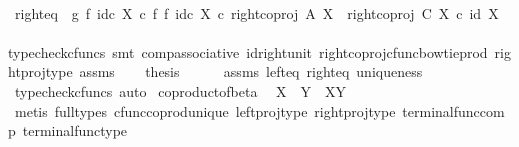 \begin{isabellebody}
\ \ \isamarkupfalse%
\ right{\isacharunderscore}{\kern0pt}eq{\isacharcolon}{\kern0pt}\ {\isachardoublequoteopen}\ {\isacharparenleft}{\kern0pt}{\isacharparenleft}{\kern0pt}g\ {\isasymbowtie}\isactrlsub f\ id\isactrlsub c\ X{\isacharparenright}{\kern0pt}\ {\isasymcirc}\isactrlsub c\ {\isacharparenleft}{\kern0pt}f\ {\isasymbowtie}\isactrlsub f\ id\isactrlsub c\ X{\isacharparenright}{\kern0pt}{\isacharparenright}{\kern0pt}\ {\isasymcirc}\isactrlsub c\ right{\isacharunderscore}{\kern0pt}coproj\ A\ X\ {\isacharequal}{\kern0pt}\ right{\isacharunderscore}{\kern0pt}coproj\ C\ X\ {\isasymcirc}\isactrlsub c\ id\ X{\isachardoublequoteclose}\isanewline
\ \ \ \ \isamarkupfalse%
{\isacharparenleft}{\kern0pt}typecheck{\isacharunderscore}{\kern0pt}cfuncs{\isacharcomma}{\kern0pt}\ smt\ comp{\isacharunderscore}{\kern0pt}associative{}\ id{\isacharunderscore}{\kern0pt}right{\isacharunderscore}{\kern0pt}unit{}\ right{\isacharunderscore}{\kern0pt}coproj{\isacharunderscore}{\kern0pt}cfunc{\isacharunderscore}{\kern0pt}bowtie{\isacharunderscore}{\kern0pt}prod\ right{\isacharunderscore}{\kern0pt}proj{\isacharunderscore}{\kern0pt}type\ assms{\isacharparenright}{\kern0pt}\isanewline
\isanewline
\ \ \isamarkupfalse%
\ {\isacharquery}{\kern0pt}thesis\isanewline
\ \ \ \ \isamarkupfalse%
\ assms\ left{\isacharunderscore}{\kern0pt}eq\ right{\isacharunderscore}{\kern0pt}eq\ uniqueness\ \isamarkupfalse%
\ {\isacharparenleft}{\kern0pt}typecheck{\isacharunderscore}{\kern0pt}cfuncs{\isacharcomma}{\kern0pt}\ auto{\isacharparenright}{\kern0pt}\isanewline
{}\isamarkupfalse%
%
\endisatagproof
{\isafoldproof}%
%
\isadelimproof
\isanewline
%
\endisadelimproof
\isanewline
{}\isamarkupfalse%
\ coproduct{\isacharunderscore}{\kern0pt}of{\isacharunderscore}{\kern0pt}beta{\isacharcolon}{\kern0pt}\isanewline
\ \ {\isachardoublequoteopen}{\isasymbeta}\isactrlbsub X\isactrlesub \ {\isasymamalg}\ {\isasymbeta}\isactrlbsub Y\isactrlesub \ {\isacharequal}{\kern0pt}\ {\isasymbeta}\isactrlbsub X{\isasymCoprod}Y\isactrlesub {\isachardoublequoteclose}\isanewline
%
\isadelimproof
\ \ %
\endisadelimproof
%
\isatagproof
{}\isamarkupfalse%
\ {\isacharparenleft}{\kern0pt}metis\ {\isacharparenleft}{\kern0pt}full{\isacharunderscore}{\kern0pt}types{\isacharparenright}{\kern0pt}\ cfunc{\isacharunderscore}{\kern0pt}coprod{\isacharunderscore}{\kern0pt}unique\ left{\isacharunderscore}{\kern0pt}proj{\isacharunderscore}{\kern0pt}type\ right{\isacharunderscore}{\kern0pt}proj{\isacharunderscore}{\kern0pt}type\ terminal{\isacharunderscore}{\kern0pt}func{\isacharunderscore}{\kern0pt}comp\ terminal{\isacharunderscore}{\kern0pt}func{\isacharunderscore}{\kern0pt}type{\isacharparenright}{\kern0pt}%

\end{isabellebody}
